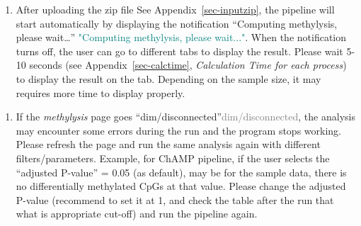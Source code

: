 \documentclass[
  a4paper,
  oneside,
  open=any]{scrreport}
\providecommand{\tightlist}{%
  \setlength{\itemsep}{0pt}\setlength{\parskip}{0pt}}\usepackage{longtable,booktabs,array}
\begin{document}
\begin{tcolorbox}[enhanced jigsaw, bottomrule=.15mm, left=2mm, coltitle=black, breakable, colback=white, arc=.35mm, rightrule=.15mm, opacitybacktitle=0.6, toptitle=1mm, leftrule=.75mm, toprule=.15mm, bottomtitle=1mm, opacityback=0, colbacktitle=quarto-callout-tip-color!10!white, titlerule=0mm, colframe=quarto-callout-tip-color-frame, title=\textcolor{quarto-callout-tip-color}{\faLightbulb}\hspace{0.5em}{Tip}]

\begin{enumerate}
\def\labelenumi{\arabic{enumi}.}
\tightlist
\item
  After uploading the zip file See Appendix~\ref{sec-inputzip}, the
  pipeline will start automatically by displaying the notification
  {``Computing methylysis, please wait\ldots{}''}
  \textcolor{teal}{"Computing methylysis, please wait..."}. When the
  notification turns off, the user can go to different tabs to display
  the result. Please wait 5-10 seconds (see Appendix~\ref{sec-calctime},
  \emph{Calculation Time for each process}) to display the result on the
  tab. Depending on the sample size, it may requires more time to
  display properly.
\end{enumerate}

\end{tcolorbox}

\begin{tcolorbox}[enhanced jigsaw, bottomrule=.15mm, left=2mm, coltitle=black, breakable, colback=white, arc=.35mm, rightrule=.15mm, opacitybacktitle=0.6, toptitle=1mm, leftrule=.75mm, toprule=.15mm, bottomtitle=1mm, opacityback=0, colbacktitle=quarto-callout-tip-color!10!white, titlerule=0mm, colframe=quarto-callout-tip-color-frame, title=\textcolor{quarto-callout-tip-color}{\faLightbulb}\hspace{0.5em}{Tip}]

\begin{enumerate}
\def\labelenumi{\arabic{enumi}.}
\setcounter{enumi}{1}
\tightlist
\item
  If the \emph{methylysis} page goes
  {``dim/disconnected''}\textcolor{gray}{dim/disconnected}, the analysis
  may encounter some errors during the run and the program stops
  working. Please refresh the page and run the same analysis again with
  different filters/parameters. Example, for ChAMP pipeline, if the user
  selects the ``adjusted P-value'' = 0.05 (as default), may be for the
  sample data, there is no differentially methylated CpGs at that value.
  Please change the adjusted P-value (recommend to set it at 1, and
  check the table after the run that what is appropriate cut-off) and
  run the pipeline again.
\end{enumerate}

\end{tcolorbox}
\end{document}
